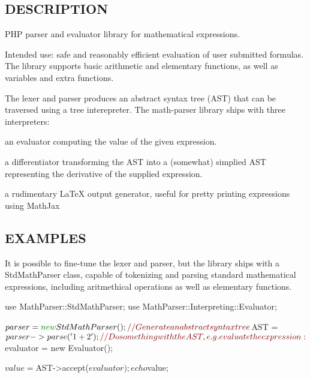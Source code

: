 \subsection*{D\-E\-S\-C\-R\-I\-P\-T\-I\-O\-N }

P\-H\-P parser and evaluator library for mathematical expressions.

Intended use\-: safe and reasonably efficient evaluation of user submitted formulas. The library supports basic arithmetic and elementary functions, as well as variables and extra functions.

The lexer and parser produces an abstract syntax tree (A\-S\-T) that can be traversed using a tree interepreter. The math-\/parser library ships with three interpreters\-:


\begin{DoxyItemize}
\item an evaluator computing the value of the given expression.
\item a differentiator transforming the A\-S\-T into a (somewhat) simplied A\-S\-T representing the derivative of the supplied expression.
\item a rudimentary La\-Te\-X output generator, useful for pretty printing expressions using Math\-Jax
\end{DoxyItemize}

\subsection*{E\-X\-A\-M\-P\-L\-E\-S }

It is possible to fine-\/tune the lexer and parser, but the library ships with a Std\-Math\-Parser class, capable of tokenizing and parsing standard mathematical expressions, including aritmethical operations as well as elementary functions.


\begin{DoxyCode}
use MathParser::StdMathParser;
use MathParser::Interpreting::Evaluator;

$parser = \textcolor{keyword}{new} StdMathParser();

\textcolor{comment}{// Generate an abstract syntax tree}
$AST = $parser->parse(\textcolor{stringliteral}{'1+2'});

\textcolor{comment}{// Do something with the AST, e.g. evaluate the expression:}
$evaluator = \textcolor{keyword}{new} Evaluator();

$value = $AST->accept($evaluator);
echo $value;
\end{DoxyCode}


